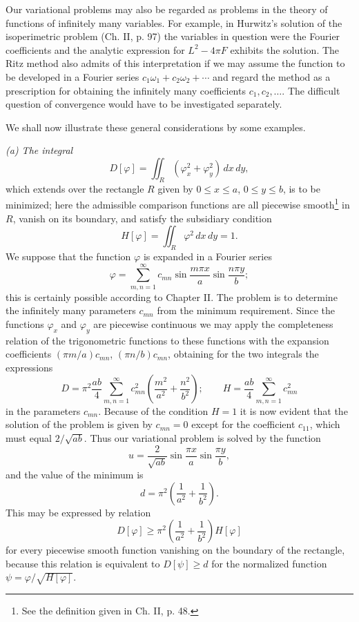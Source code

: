 Our variational problems may also be regarded as problems in the theory of functions of infinitely many variables. For example, in Hurwitz's solution of the isoperimetric problem (Ch. II, p. 97) the variables in question were the Fourier coefficients and the analytic expression for $L^2-4\pi F$ exhibits the solution. The Ritz method also admits of this interpretation if we may assume the function to be developed in a Fourier series $c_1\omega_1+c_2\omega_2+\cdots$ and regard the method as a prescription for obtaining the infinitely many coefficients $c_1,c_2,\ldots$. The difficult question of convergence would have to be investigated separately.

We shall now illustrate these general considerations by some examples.

\emph{(a) The integral}
\begin{equation}\tag{6}
D[\varphi]=\iint_R(\varphi_x^2+\varphi_y^2)\,dx\,dy,
\end{equation}
which extends over the rectangle $R$ given by $0\le x\le a$, $0\le y\le b$, is to be minimized; here the admissible comparison functions are all piecewise smooth\footnote{See the definition given in Ch. II, p. 48.} in $R$, vanish on its boundary, and satisfy the subsidiary condition
\begin{equation}\tag{7}
H[\varphi]=\iint_R\varphi^2\,dx\,dy=1.
\end{equation}
We suppose that the function $\varphi$ is expanded in a Fourier series
\[
\varphi=\sum_{m,n=1}^{\infty}c_{mn}\sin\frac{m\pi x}{a}\sin\frac{n\pi y}{b};
\]
this is certainly possible according to Chapter II. The problem is to determine the infinitely many parameters $c_{mn}$ from the minimum requirement. Since the functions $\varphi_x$ and $\varphi_y$ are piecewise continuous we may apply the completeness relation of the trigonometric functions to these functions with the expansion coefficients $(\pi m/a)c_{mn}$, $(\pi n/b)c_{mn}$, obtaining for the two integrals the expressions
\begin{equation}\tag{8}
D=\pi^2\frac{ab}{4}\sum_{m,n=1}^{\infty}c_{mn}^2\left(\frac{m^2}{a^2}+\frac{n^2}{b^2}\right);\qquad
H=\frac{ab}{4}\sum_{m,n=1}^{\infty}c_{mn}^2
\end{equation}
in the parameters $c_{mn}$. Because of the condition $H=1$ it is now evident that the solution of the problem is given by $c_{mn}=0$ except for the coefficient $c_{11}$, which must equal $2/\sqrt{ab}$. Thus our variational problem is solved by the function
\[
u=\frac{2}{\sqrt{ab}}\sin\frac{\pi x}{a}\sin\frac{\pi y}{b},
\]
and the value of the minimum is
\[
d=\pi^2\left(\frac{1}{a^2}+\frac{1}{b^2}\right).
\]
This may be expressed by relation
\begin{equation}\tag{9}
D[\varphi]\ge\pi^2\left(\frac{1}{a^2}+\frac{1}{b^2}\right)H[\varphi]
\end{equation}
for every piecewise smooth function vanishing on the boundary of the rectangle, because this relation is equivalent to $D[\psi]\ge d$ for the normalized function $\psi=\varphi/\sqrt{H[\varphi]}$.

